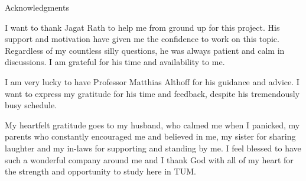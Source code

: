 \thispagestyle{empty}

\vspace*{2cm}

\begin{center}
{ Acknowledgments}
\end{center}

\vspace{1cm}

I want to thank Jagat Rath to help me from ground up for this project. His support and motivation have given me the confidence to work on this topic. Regardless of my countless silly questions, he was always patient and calm in discussions. I am grateful for his time and availability to me.

I am very lucky to have Professor Matthias Althoff for his guidance and advice. I want to express my gratitude for his time and feedback, despite his tremendously busy schedule.

My heartfelt gratitude goes to my husband, who calmed me when I panicked, my parents who constantly encouraged me and believed in me, my sister for sharing laughter and my in-laws for supporting and standing by me. I feel blessed to have such a wonderful company around me and I thank God with all of my heart for the strength and opportunity to study here in TUM.

\cleardoublepage{}
